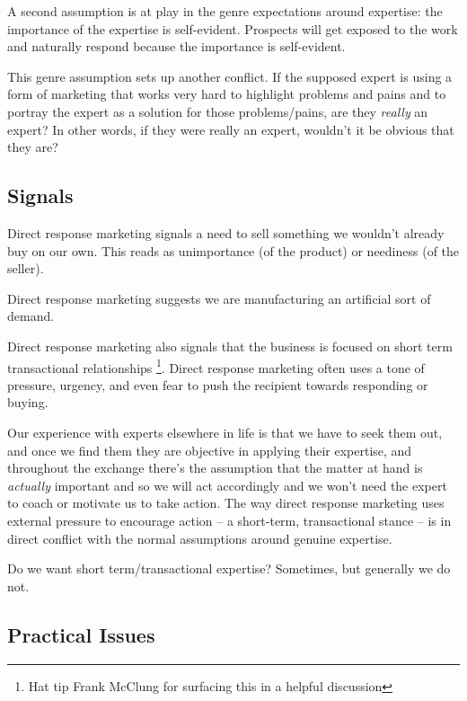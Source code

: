\documentclass[13pt,]{tufte-handout}
\begin{document}
A second assumption is at play in the genre expectations around
expertise: the importance of the expertise is self-evident. Prospects
will get exposed to the work and naturally respond because the
importance is self-evident.

This genre assumption sets up another conflict. If the supposed expert
is using a form of marketing that works very hard to highlight problems
and pains and to portray the expert as a solution for those
problems/pains, are they \emph{really} an expert? In other words, if
they were really an expert, wouldn't it be obvious that they are?

\hypertarget{signals}{%
\subsection{Signals}\label{signals}}

Direct response marketing signals a need to sell something we wouldn't
already buy on our own. This reads as unimportance (of the product) or
neediness (of the seller).

Direct response marketing suggests we are manufacturing an artificial
sort of demand.

Direct response marketing also signals that the business is focused on
short term transactional relationships \footnote{Hat tip Frank McClung
  for surfacing this in a helpful discussion}. Direct response marketing
often uses a tone of pressure, urgency, and even fear to push the
recipient towards responding or buying.

Our experience with experts elsewhere in life is that we have to seek
them out, and once we find them they are objective in applying their
expertise, and throughout the exchange there's the assumption that the
matter at hand is \emph{actually} important and so we will act
accordingly and we won't need the expert to coach or motivate us to take
action. The way direct response marketing uses external pressure to
encourage action -- a short-term, transactional stance -- is in direct
conflict with the normal assumptions around genuine expertise.

Do we want short term/transactional expertise? Sometimes, but generally
we do not.

\hypertarget{practical-issues}{%
\subsection{Practical Issues}\label{practical-issues}}
\end{document}
